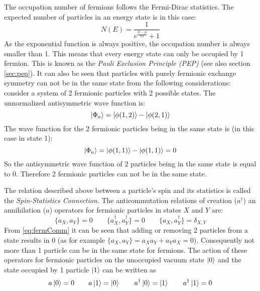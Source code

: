 The occupation number of fermions follows the Fermi-Dirac statistics. The expected number of particles in an energy state is in this case:
\begin{equation}
 N(E) = \frac{1}{e^{\frac{E-\mu}{kT}}+1}
\end{equation} 
As the exponential function is always positive, the occupation number is always smaller than 1. This means that every energy state can only be occupied by 1 fermion. This is known as the \textit{Pauli Exclusion Principle (PEP)} (see also section \ref{sec:pep}). It can also be seen that particles with purely fermionic exchange symmetry can not be in the same state from the following considerations: consider a system of 2 fermionic particles with 2 possible states. The unnormalized antisymmetric wave function is:
\begin{equation}
 \ket{\Phi_{a}} = \ket{\phi(1,2)} - \ket{\phi(2,1)} 
\end{equation} 
The wave function for the 2 fermionic particles being in the same state is (in this case in state 1):
\begin{equation}
 \ket{\Phi_{a}} = \ket{\phi(1,1)} - \ket{\phi(1,1)} = 0
\end{equation} 
So the antisymmetric wave function of 2 particles being in the same state is equal to 0. Therefore 2 fermionic particles can not be in the same state.

The relation described above between a particle's spin and its statistics is called the \textit{Spin-Statistics Connection}. The anticommutation relations of creation ($a^{\dag}$) an annihilation ($a$) operators for fermionic particles in states $X$ and $Y$ are:
\begin{equation}
\label{eq:fermComm}
 \{a_{X},a_{Y}\} = 0 \hspace{2em} \{a^{\dag}_{X},a^{\dag}_{Y}\} = 0 \hspace{2em} \{a_{X},a^{\dag}_{Y}\} = \delta_{X,Y}
\end{equation} 
From \ref{eq:fermComm} it can be seen that adding or removing 2 particles from a state results in 0 (as for example $\{a_{X},a_{Y}\} = a_{X}a_{Y} + a_{Y}a_{X} = 0$). Consequently not more than 1 particle can be in the same state for fermions. The action of these operators for fermionic particles on the unoccupied vacuum state $\ket{0}$ and the state occupied by 1 particle $\ket{1}$ can be written as
\begin{equation}
\label{eq:fermCreatAnnihOp}
 a \ket{0} = 0 \hspace{2em} a \ket{1} = \ket{0} \hspace{2em} a^{\dag} \ket{0} = \ket{1} \hspace{2em} a^{\dag} \ket{1} = 0
\end{equation} 

